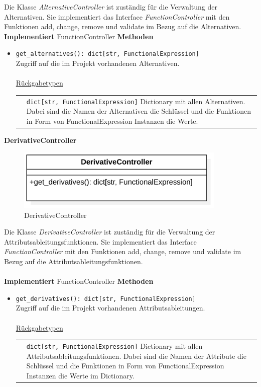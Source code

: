 \documentclass{article}
\begin{document}
\begin{itemize}
Die Klasse \textit{AlternativeController} ist zuständig für die Verwaltung der Alternativen. Sie implementiert das Interface \textit{FunctionController} mit den Funktionen add, change, remove und validate im Bezug auf die Alternativen.
\newline\newline
\textbf{\large{Implementiert}} FunctionController 
\textbf{\large{Methoden}}
\begin{itemize}
\item \texttt{get\_alternatives(): dict[str, FunctionalExpression]}\\ Zugriff auf die im Projekt vorhandenen Alternativen.\\\\
\underline{{Rückgabetypen}}\\
\begin{tabular}{lp{10.7cm}}
 & \texttt{dict[str, FunctionalExpression]}  Dictionary mit allen Alternativen. Dabei sind die Namen der Alternativen die Schlüssel und die Funktionen in Form von FunctionalExpression Instanzen die Werte.\\
\end{tabular}
\end{itemize}


\newpage
\textbf{\large{DerivativeController}}
\begin{figure}[H]%
    \centering
    \includegraphics[width=10cm]{entwurf/Floriane/DerivativeController.png}
    \caption{DerivativeController}
\end{figure}

Die Klasse \textit{DerivativeController} ist zuständig für die Verwaltung der Attributsableitungsfunktionen. Sie implementiert das Interface \textit{FunctionController} mit den Funktionen add, change, remove und validate im Bezug auf die Attributsableitungsfunktionen.\\\\
\textbf{\large{Implementiert}} FunctionController 
\textbf{\large{Methoden}}
\begin{itemize}
\item \texttt{get\_derivatives(): dict[str, FunctionalExpression]}\\ Zugriff auf die im Projekt vorhandenen Attributsableitungen.\\\\
\underline{{Rückgabetypen}}\\
\begin{tabular}{lp{10.7cm}}
 & \texttt{dict[str, FunctionalExpression]}  Dictionary mit allen Attributsableitungsfunktionen. Dabei sind die Namen der Attribute die Schlüssel und die Funktionen in Form von FunctionalExpression Instanzen die Werte im Dictionary.\\
\end{tabular}
\end{itemize}


\end{itemize}
\end{document}

